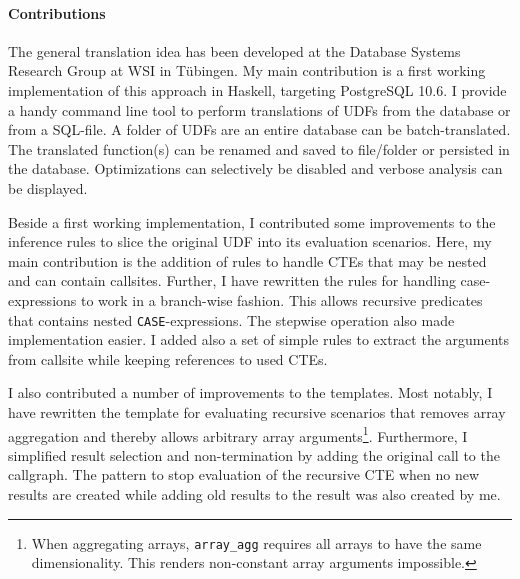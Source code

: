     
\paragraph*{Contributions} The general translation idea has been developed at the Database Systems Research Group at WSI in Tübingen. My main contribution is a first working implementation of this approach in Haskell, targeting PostgreSQL 10.6. I provide a handy command line tool to perform translations of UDFs from the database or from a SQL-file. A folder of UDFs are an entire database can be batch-translated. The translated function(s) can be renamed and saved to file/folder or persisted in the database. Optimizations can selectively be disabled and verbose analysis can be displayed.

Beside a first working implementation, I contributed some improvements to the inference rules to slice the original UDF into its evaluation scenarios. Here, my main contribution is the addition of rules to handle CTEs that may be nested and can contain callsites. Further, I have rewritten the rules for handling case-expressions to work in a branch-wise fashion. This allows recursive predicates that contains nested \texttt{CASE}-expressions. The stepwise operation also made implementation easier. I added also a set of simple rules to extract the arguments from callsite while keeping references to used CTEs.

I also contributed a number of improvements to the templates. Most notably, I have rewritten the template for evaluating recursive scenarios that removes array aggregation and thereby allows arbitrary array arguments\footnote{When aggregating arrays, \texttt{array\_agg} requires all arrays to have the same dimensionality. This renders non-constant array arguments impossible.}. Furthermore, I simplified result selection and non-termination by adding the original call to the callgraph. The pattern to stop evaluation of the recursive CTE when no new results are created while adding old results to the result was also created by me.

